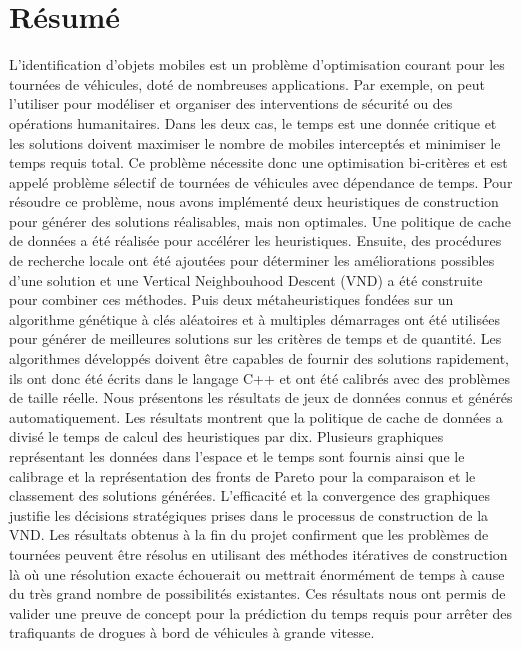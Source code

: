 \section*{Résumé}

L'identification d'objets mobiles est un problème d'optimisation courant pour les tournées de véhicules, doté de nombreuses applications. Par exemple, on peut l'utiliser pour modéliser et organiser des interventions de sécurité ou des opérations humanitaires. Dans les deux cas, le temps est une donnée critique et les solutions doivent maximiser le nombre de mobiles interceptés et minimiser le temps requis total. Ce problème nécessite donc une optimisation bi-critères et est appelé problème sélectif de tournées de véhicules avec dépendance de temps. Pour résoudre ce problème, nous avons implémenté deux heuristiques de construction pour générer des solutions réalisables, mais non optimales. Une politique de cache de données a été réalisée pour accélérer les heuristiques. Ensuite, des procédures de recherche locale ont été ajoutées pour déterminer les améliorations possibles d'une solution et une Vertical Neighbouhood Descent (VND) a été construite pour combiner ces méthodes. Puis deux métaheuristiques fondées sur un algorithme génétique à clés aléatoires et à multiples démarrages ont été utilisées pour générer de meilleures solutions sur les critères de temps et de quantité. Les algorithmes développés doivent être capables de fournir des solutions rapidement, ils ont donc été écrits dans le langage C++ et ont été calibrés avec des problèmes de taille réelle. Nous présentons les résultats de jeux de données connus et générés automatiquement. Les résultats montrent que la politique de cache de données a divisé le temps de calcul des heuristiques par dix. Plusieurs graphiques représentant les données dans l'espace et le temps sont fournis ainsi que le calibrage et la représentation des fronts de Pareto pour la comparaison et le classement des solutions générées. L'efficacité et la convergence des graphiques justifie les décisions stratégiques prises dans le processus de construction de la VND. Les résultats obtenus à la fin du projet confirment que les problèmes de tournées peuvent être résolus en utilisant des méthodes itératives de construction là où une résolution exacte échouerait ou mettrait énormément de temps à cause du très grand nombre de possibilités existantes. Ces résultats nous ont permis de valider une preuve de concept pour la prédiction du temps requis pour arrêter des trafiquants de drogues à bord de véhicules à grande vitesse.

